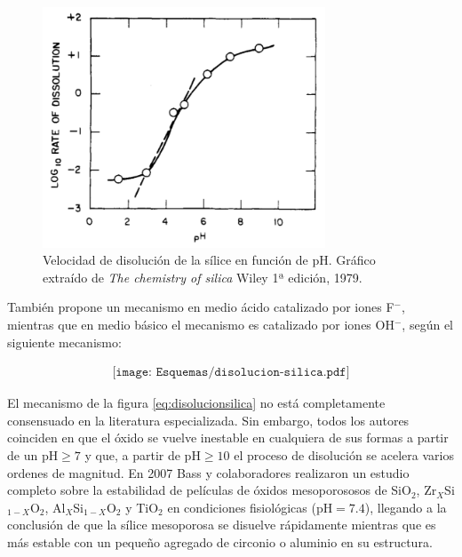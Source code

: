 			\begin{figure}[th!]
			    \begin{center}
			    \includegraphics[width=0.75\textwidth]{Graficos/disolucion_ph.jpg}
	       		\caption[Velocidad de disolución sílice en función del pH]{Velocidad de disolución de la sílice en función de pH. Gráfico extraído de \textit{The chemistry of silica} Wiley 1ª edición, 1979.\cite{iler1979}}
	         	\label{fig:disolucion_ph}
	     		\end{center}
	     		\end{figure}
	
	\pagebreak También propone un mecanismo en medio ácido catalizado por iones F$^-$, mientras que en medio básico el mecanismo es catalizado por iones OH$^-$, según el siguiente mecanismo:
		
			\begin{equation}
				\begin{aligned}
				\texttt{[image: Esquemas/disolucion-silica.pdf]}
				\label{eq:disolucionsilica}
				\end{aligned}
				\end{equation} 
	
	El mecanismo de la figura \ref{eq:disolucionsilica} no está completamente consensuado en la literatura especializada. Sin embargo, todos los autores coinciden en que el óxido se vuelve inestable en cualquiera de sus formas a partir de un $\text{pH}\geq7$ y que, a partir de $\text{pH}\geq10$ el proceso de disolución se acelera varios ordenes de magnitud.\cite{Kosmulski2002,Kosmulski2014,Schwarz1984,Si-HanWu2013,iler1979} En 2007 Bass y colaboradores\cite{bass2007} realizaron un estudio completo sobre la estabilidad de películas de óxidos mesoporososos de SiO$_2$, Zr$_X$Si$_{1-X}$O$_2$, Al$_X$Si$_{1-X}$O$_2$ y TiO$_2$ en condiciones fisiológicas (pH$=7.4$), llegando a la conclusión de que la sílice mesoporosa se disuelve rápidamente mientras que es más estable con un pequeño agregado de circonio o aluminio en su estructura.	

